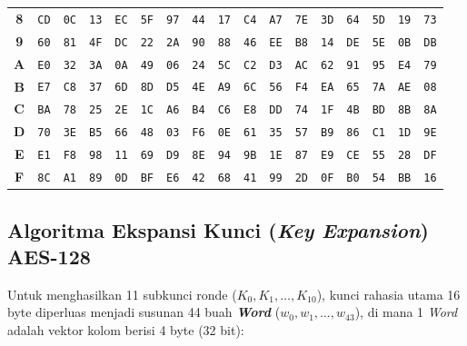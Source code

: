 \documentclass[11pt,a4paper]{article}
\begin{document}
\begin{table}[H]
\begin{tabular}{|c|cccccccccccccccc|}
\textbf{8} & \texttt{CD} & \texttt{0C} & \texttt{13} & \texttt{EC} & \texttt{5F} & \texttt{97} & \texttt{44} & \texttt{17} & \texttt{C4} & \texttt{A7} & \texttt{7E} & \texttt{3D} & \texttt{64} & \texttt{5D} & \texttt{19} & \texttt{73} \\
\textbf{9} & \texttt{60} & \texttt{81} & \texttt{4F} & \texttt{DC} & \texttt{22} & \texttt{2A} & \texttt{90} & \texttt{88} & \texttt{46} & \texttt{EE} & \texttt{B8} & \texttt{14} & \texttt{DE} & \texttt{5E} & \texttt{0B} & \texttt{DB} \\
\textbf{A} & \texttt{E0} & \texttt{32} & \texttt{3A} & \texttt{0A} & \texttt{49} & \texttt{06} & \texttt{24} & \texttt{5C} & \texttt{C2} & \texttt{D3} & \texttt{AC} & \texttt{62} & \texttt{91} & \texttt{95} & \texttt{E4} & \texttt{79} \\
\textbf{B} & \texttt{E7} & \texttt{C8} & \texttt{37} & \texttt{6D} & \texttt{8D} & \texttt{D5} & \texttt{4E} & \texttt{A9} & \texttt{6C} & \texttt{56} & \texttt{F4} & \texttt{EA} & \texttt{65} & \texttt{7A} & \texttt{AE} & \texttt{08} \\
\textbf{C} & \texttt{BA} & \texttt{78} & \texttt{25} & \texttt{2E} & \texttt{1C} & \texttt{A6} & \texttt{B4} & \texttt{C6} & \texttt{E8} & \texttt{DD} & \texttt{74} & \texttt{1F} & \texttt{4B} & \texttt{BD} & \texttt{8B} & \texttt{8A} \\
\textbf{D} & \texttt{70} & \texttt{3E} & \texttt{B5} & \texttt{66} & \texttt{48} & \texttt{03} & \texttt{F6} & \texttt{0E} & \texttt{61} & \texttt{35} & \texttt{57} & \texttt{B9} & \texttt{86} & \texttt{C1} & \texttt{1D} & \texttt{9E} \\
\textbf{E} & \texttt{E1} & \texttt{F8} & \texttt{98} & \texttt{11} & \texttt{69} & \texttt{D9} & \texttt{8E} & \texttt{94} & \texttt{9B} & \texttt{1E} & \texttt{87} & \texttt{E9} & \texttt{CE} & \texttt{55} & \texttt{28} & \texttt{DF} \\
\textbf{F} & \texttt{8C} & \texttt{A1} & \texttt{89} & \texttt{0D} & \texttt{BF} & \texttt{E6} & \texttt{42} & \texttt{68} & \texttt{41} & \texttt{99} & \texttt{2D} & \texttt{0F} & \texttt{B0} & \texttt{54} & \texttt{BB} & \texttt{16} \\
\hline
\end{tabular}
\end{table}

\subsection{Algoritma Ekspansi Kunci (\textit{Key Expansion}) AES-128}
Untuk menghasilkan 11 subkunci ronde ($K_0, K_1, \dots, K_{10}$), kunci rahasia utama 16 byte diperluas menjadi susunan 44 buah \textbf{\textit{Word}} ($w_0, w_1, \dots, w_{43}$), di mana 1 \textit{Word} adalah vektor kolom berisi 4 byte (32 bit):
\end{document}
